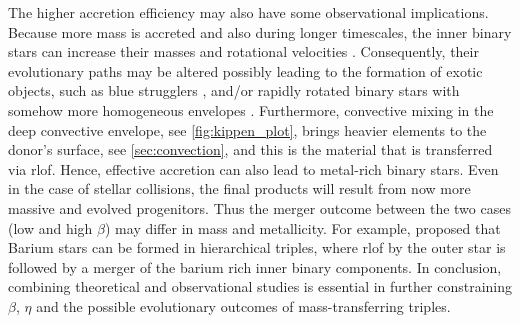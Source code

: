 The higher accretion efficiency may also have some observational implications. Because more mass is accreted and also during longer timescales, the inner binary stars can increase their masses and rotational velocities \citep{packet1981rotation}. Consequently, their evolutionary paths may be altered possibly leading to the formation of exotic objects, such as blue strugglers \citep{zwart2019triple}, and/or rapidly rotated binary stars with somehow more homogeneous envelopes \citep{dorozsmai2023stellar}. Furthermore, convective mixing in the deep convective envelope, see \cref{fig:kippen_plot}, brings heavier elements to the donor's surface, see \cref{sec:convection}, and this is the material that is transferred via \ac{rlof}. Hence, effective accretion can also lead to metal-rich binary stars. Even in the case of stellar collisions, the final products will result from now more massive and evolved progenitors. Thus the merger outcome between the two cases (low and high $\beta$) may differ in mass and metallicity. For example, \cite{gao2023stellar} proposed that Barium stars can be formed in hierarchical triples, where \ac{rlof} by the outer star is followed by a merger of the barium rich inner binary components. In conclusion, combining theoretical and observational studies is essential in further constraining $\beta$, $\eta$ and the possible evolutionary outcomes of mass-transferring triples.



